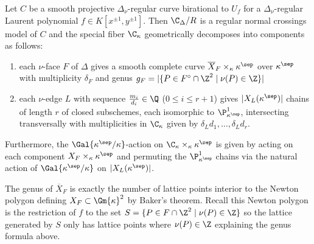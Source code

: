 \begin{theorem}
Let $C$ be a smooth projective $\Delta_\nu$-regular curve birational to $U_f$ for a $\Delta_\nu$-regular Laurent polynomial $f \in K[x^{\pm 1}, y^{\pm 1}]$. Then $\C_\Delta / R$ is a regular normal crossings model of $C$ and the special fiber $\C_\kappa$ geometrically decomposes into components as follows:
\begin{enumerate}
\item each $\nu$-face $F$ of $\Delta$ gives a smooth complete curve $\overline{X}_F \times_\kappa \kappa^{\sep}$ over $\kappa^\sep$ with multiplicity $\delta_F$ and genus $g_F = |\{ P \in F^\circ \cap \Z^2 \mid \nu(P) \in \Z \} |$
\item each $\nu$-edge $L$ with sequence $\frac{m_i}{d_i} \in \Q$ ($0 \le i \le r + 1$) gives $|X_L(\kappa^\sep)|$ chains of length $r$ of closed subschemes, each isomorphic to $\P^1_{\kappa^{\sep}}$, intersecting transversally with multiplicities in $\C_\kappa$ given by $\delta_L d_1, \dots, \delta_L d_r$.
\end{enumerate}
Furthermore, the $\Gal{\kappa^\sep / \kappa}$-action on $\C_{\kappa} \times_\kappa \kappa^{\sep}$ is given by acting on each component $X_F \times_\kappa \kappa^\sep$ and permuting the $\P^1_{\kappa^\sep}$ chains via the natural action of $\Gal{\kappa^\sep / \kappa}$ on $|X_L(\kappa^\sep)|$. 
\end{theorem}

\begin{rmk}
The genus of $\overline{X}_F$ is exactly the number of lattice points interior to the Newton polygon defining $X_F \subset \Gm{\kappa}^2$ by Baker's theorem. Recall this Newton polygon is the restriction of $f$ to the set $S = \{ P \in F \cap \Z^2 \mid \nu(P) \in \Z \}$ so the lattice generated by $S$ only has lattice points where $\nu(P) \in \Z$ explaining the genus formula above. 
\end{rmk}

